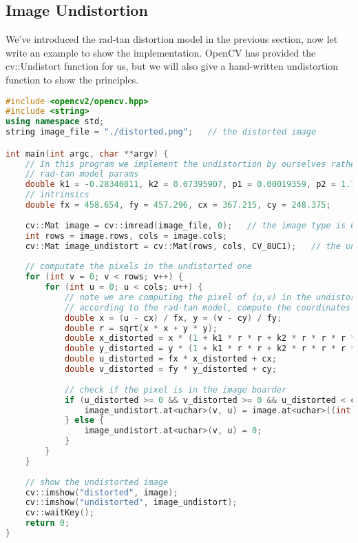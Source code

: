 \subsection{Image Undistortion}
We've introduced the rad-tan distortion model in the previous section, now let write an example to show the implementation. OpenCV has provided the cv::Undistort function for us, but we will also give a hand-written undistortion function to show the principles.

\begin{lstlisting}[language=C++,caption=slambook/ch5/imageBasics/undistortImage.cpp]
#include <opencv2/opencv.hpp>
#include <string>
using namespace std;
string image_file = "./distorted.png";   // the distorted image 

int main(int argc, char **argv) {
    // In this program we implement the undistortion by ourselves rather than using opencv
    // rad-tan model params
    double k1 = -0.28340811, k2 = 0.07395907, p1 = 0.00019359, p2 = 1.76187114e-05;
    // intrinsics
    double fx = 458.654, fy = 457.296, cx = 367.215, cy = 248.375;
    
    cv::Mat image = cv::imread(image_file, 0);   // the image type is CV_8UC1
    int rows = image.rows, cols = image.cols;
    cv::Mat image_undistort = cv::Mat(rows, cols, CV_8UC1);   // the undistorted image
    
    // computate the pixels in the undistorted one
    for (int v = 0; v < rows; v++) {
        for (int u = 0; u < cols; u++) {
            // note we are computing the pixel of (u,v) in the undistorted image
            // according to the rad-tan model, compute the coordinates in the distorted image
            double x = (u - cx) / fx, y = (v - cy) / fy;
            double r = sqrt(x * x + y * y);
            double x_distorted = x * (1 + k1 * r * r + k2 * r * r * r * r) + 2 * p1 * x * y + p2 * (r * r + 2 * x * x);
            double y_distorted = y * (1 + k1 * r * r + k2 * r * r * r * r) + p1 * (r * r + 2 * y * y) + 2 * p2 * x * y;
            double u_distorted = fx * x_distorted + cx;
            double v_distorted = fy * y_distorted + cy;
            
            // check if the pixel is in the image boarder
            if (u_distorted >= 0 && v_distorted >= 0 && u_distorted < cols && v_distorted < rows) {
                image_undistort.at<uchar>(v, u) = image.at<uchar>((int) v_distorted, (int) u_distorted);
            } else {
                image_undistort.at<uchar>(v, u) = 0;
            }
        }
    }
    
    // show the undistorted image
    cv::imshow("distorted", image);
    cv::imshow("undistorted", image_undistort);
    cv::waitKey();
    return 0;
}
\end{lstlisting}

